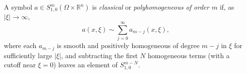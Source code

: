 
A symbol $a\in S^m_{1,0}(\Omega\times\mathbb R^n)$ is \emph{classical} or \emph{polyhomogeneous of order $m$} if, as $|\xi|\to\infty$,
\[
a(x,\xi)\sim\sum_{j=0}^\infty a_{m-j}(x,\xi),
\]
where each $a_{m-j}$ is smooth and positively homogeneous of degree $m-j$ in $\xi$ for sufficiently large $|\xi|$, and subtracting the first $N$ homogeneous terms (with a cutoff near $\xi=0$) leaves an element of $S^{m-N}_{1,0}$.
